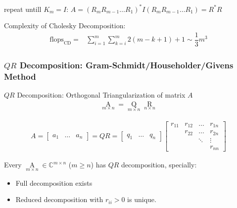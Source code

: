     repeat untill $ K_m=I $: $ A=(R_mR_{m-1}\ldots R_1)^*I(R_mR_{m-1}\ldots R_1)=R^*R $
    
    Complexity of Cholesky Decomposition:
    \begin{align}
        \mathrm{flops}_\mathrm{CD}=&\sum_{i=1}^{m}\sum_{k=i}^m 2(m-k+1)+1 \sim \dfrac{1}{3}m^3
    \end{align}
 
    
    









    



\subsubsection{$ QR $ Decomposition: Gram-Schmidt/Householder/Givens Method}\label{SubSubSectionQRDecomposition}
    
    $ QR $ Decomposition: Orthogonal Triangularization of matrix $ A $
\begin{align}
    \mathop{A}\limits_{m\times n} =\mathop{Q}\limits_{m\times n} \mathop{R}\limits_{n\times n}     
\end{align}


\begin{align}
    A=\begin{bmatrix}
        a_1&\ldots &a_n
    \end{bmatrix} 
    =QR=
    \begin{bmatrix}
        q_1&\ldots&q_n
    \end{bmatrix}
    \begin{bmatrix}
        r_{11}&r_{12}&\ldots&r_{1n}\\
        &r_{22}&\ldots&r_{2n}\\
        &&\ddots&\vdots\\
        &&&r_{nn}
    \end{bmatrix}
\end{align}

    Every $ \mathop{A}\limits_{m\times n} \in \mathbb{C}^{m\times n} $ ($ m\geq n $) has $ QR $ decomposition, specially:
    \begin{itemize}[topsep=2pt,itemsep=0pt]
        \item Full decomposition exists
        \item Reduced decomposition with $ r_{ii}>0 $ is unique.
    \end{itemize}
    
